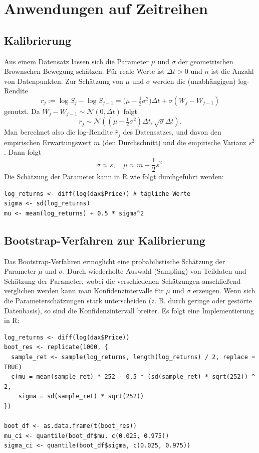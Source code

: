 \section{Anwendungen auf Zeitreihen}

\subsection{Kalibrierung}
Aus einem Datensatz lassen sich die Parameter $\mu$ und $\sigma$ der
geometrischen Brownschen Bewegung schätzen. 
Für reale Werte ist $\Delta t \gt 0$ und $n$ ist die Anzahl von Datenpunkten. 
Zur Schätzung von $\mu$ und $\sigma$ werden die (unabhängigen) log-Rendite
$$r_j := \log S_j - \log S_{j-1}= \big(\mu - \tfrac12 \sigma^2\big)\Delta t + \sigma (W_j - W_{j-1})$$
genutzt. Da $W_j - W_{j-1} \sim \mathcal N(0, \Delta t)$ folgt
$$r_j \sim \mathcal N((\mu - \tfrac12 \sigma^2)\Delta t, \sqrt{\sigma} \Delta t).$$
Man berechnet also die log-Rendite $\hat r_j$ des Datensatzes, 
und davon den empirischen Erwartungswert $m$ (den Durchschnitt) und die empirische Varianz $s^2$. 
Dann folgt $$\sigma \approx s,\quad \mu \approx m + \frac{1}{2} s^2.$$
Die Schätzung der Parameter kann in R wie folgt durchgeführt werden:

\begin{lstlisting}
log_returns <- diff(log(dax$Price)) # tägliche Werte
sigma <- sd(log_returns)
mu <- mean(log_returns) + 0.5 * sigma^2
\end{lstlisting}

\subsection{Bootstrap-Verfahren zur Kalibrierung}
Das Bootstrap-Verfahren ermöglicht eine probabilistische Schätzung der Parameter $\mu$ und $\sigma$. 
Durch wiederholte Auswahl (Sampling) von Teildaten und Schätzung der Parameter, 
wobei die verschiedenen Schätzungen anschließend verglichen werden kann man Konfidenzintervalle für $\mu$ und $\sigma$ erzeugen. 
Wenn sich die Parameterschätzungen stark unterscheiden (z. B. durch geringe oder gestörte Datenbasis), so sind die Konfidenzintervall breiter.
Es folgt eine Implementierung in R:

\begin{lstlisting}
log_returns <- diff(log(dax$Price))
boot_res <- replicate(1000, {
  sample_ret <- sample(log_returns, length(log_returns) / 2, replace = TRUE)
  c(mu = mean(sample_ret) * 252 - 0.5 * (sd(sample_ret) * sqrt(252)) ^ 2,
    sigma = sd(sample_ret) * sqrt(252))
})

boot_df <- as.data.frame(t(boot_res))
mu_ci <- quantile(boot_df$mu, c(0.025, 0.975))
sigma_ci <- quantile(boot_df$sigma, c(0.025, 0.975))
\end{lstlisting}

